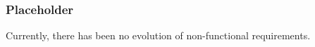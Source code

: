 \subsubsection{Placeholder}


Currently, there has been no evolution of non-functional requirements.
